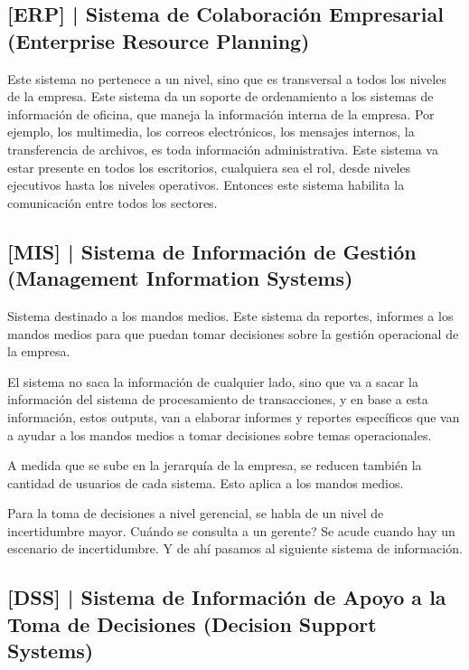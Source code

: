 \hypertarget{sistema-de-colaboraciuxf3n-empresarial-erp}{%
\subsection{%
{[}ERP{]} |
Sistema de Colaboración Empresarial
(Enterprise Resource Planning)
}\label{sistema-de-colaboraciuxf3n-empresarial-erp}}

Este sistema no pertenece a un nivel, sino que es transversal a todos
los niveles de la empresa. Este sistema da un soporte de ordenamiento a
los sistemas de información de oficina, que maneja la información
interna de la empresa. Por ejemplo, los multimedia, los correos
electrónicos, los mensajes internos, la transferencia de archivos, es
toda información administrativa. Este sistema va estar presente en todos
los escritorios, cualquiera sea el rol, desde niveles ejecutivos hasta
los niveles operativos. Entonces este sistema habilita la comunicación
entre todos los sectores.

\hypertarget{sistema-de-informaciuxf3n-de-gestiuxf3n-mis}{%
\subsection{%
{[}MIS{]} |
Sistema de Información de Gestión
(Management Information Systems)
}\label{sistema-de-informaciuxf3n-de-gestiuxf3n-mis}}

Sistema destinado a los mandos medios. Este sistema da reportes,
informes a los mandos medios para que puedan tomar decisiones sobre la
gestión operacional de la empresa.

El sistema no saca la información de cualquier lado, sino que va a sacar
la información del sistema de procesamiento de transacciones, y en base
a esta información, estos outputs, van a elaborar informes y reportes
específicos que van a ayudar a los mandos medios a tomar decisiones
sobre temas operacionales.

A medida que se sube en la jerarquía de la empresa, se reducen también
la cantidad de usuarios de cada sistema. Esto aplica a los mandos
medios.

Para la toma de decisiones a nivel gerencial, se habla de un nivel de
incertidumbre mayor. Cuándo se consulta a un gerente? Se acude cuando
hay un escenario de incertidumbre. Y de ahí pasamos al siguiente sistema
de información.

\hypertarget{sistema-de-informaciuxf3n-de-apoyo-a-la-toma-de-decisiones}{%
\subsection{%
{[}DSS{]} |
Sistema de Información de Apoyo a la Toma de Decisiones
(Decision Support Systems)
}\label{sistema-de-informaciuxf3n-de-apoyo-a-la-toma-de-decisiones}}

